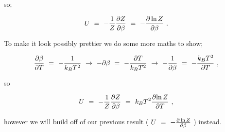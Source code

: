 \documentclass{article}
\begin{document}
so;

\begin{equation} \label{eb-eq-1-215}
U \hspace{0.125cm} = \hspace{0.125cm} - \frac{1}{Z} \frac{\partial{Z}}{\partial{\beta}} \hspace{0.125cm} = \hspace{0.125cm} - \frac{\partial \ln{Z}}{\partial{\beta}} \hspace{0.125cm} .
\end{equation}

To make it look possibly prettier we do some more maths to show;

\begin{equation} \label{eb-eq-1-216}
\frac{\partial{\beta}}{\partial{T}} \hspace{0.125cm} = \hspace{0.125cm} - \frac{1}{k_B T^2} \hspace{0.125cm} \rightarrow \hspace{0.125cm} - \partial{\beta} \hspace{0.125cm} = \hspace{0.125cm} - \frac{\partial{T}}{k_B T^2} \hspace{0.125cm} \rightarrow \hspace{0.125cm} - \frac{1}{\partial{\beta}} \hspace{0.125cm} = \hspace{0.125cm} - \frac{k_B T^2}{\partial{T}} \hspace{0.125cm} , 
\end{equation}

so 

\begin{equation} \label{eb-eq-1-217}
U \hspace{0.125cm} = \hspace{0.125cm} - \frac{1}{Z} \frac{\partial{Z}}{\partial{\beta}} \hspace{0.125cm} = \hspace{0.125cm} k_B T^2 \frac{\partial{\ln{Z}}}{\partial{T}} \hspace{0.125cm} ,
\end{equation}

however we will build off of our previous result ( \begin{math} U \hspace{0.125cm} = \hspace{0.125cm} - \frac{\partial \ln{Z}}{\partial{\beta}} \end{math} ) instead.
\end{document}
